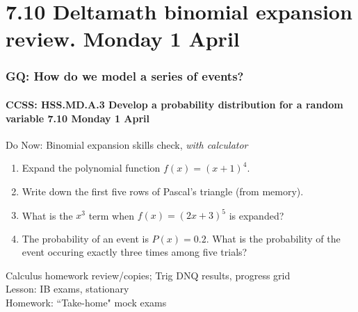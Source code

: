 \documentclass{beamer}
\begin{document}
\section{7.10 Deltamath binomial expansion review. Monday 1 April}
  \frame
  {
    \frametitle{GQ: How do we model a series of events?}
    \framesubtitle{CCSS: HSS.MD.A.3 Develop a probability distribution for a random variable \hfill \alert{7.10 Monday 1 April}}

    \begin{block}{Do Now: Binomial expansion skills check, \emph{with calculator}}
    \begin{enumerate}
      \item Expand the polynomial function $f(x)=(x+1)^4$.
      \item Write down the first five rows of Pascal's triangle (from memory).
      \item What is the $x^3$ term when $f(x)=(2x+3)^5$ is expanded?
      \item The probability of an event is $P(x)=0.2$. What is the probability of the event occuring exactly three times among five trials?
    \end{enumerate}
    \end{block}
    Calculus homework review/copies; Trig DNQ results, progress grid\\
    Lesson: IB exams, stationary\\
    Homework: ``Take-home" mock exams
  }
\end{document}
